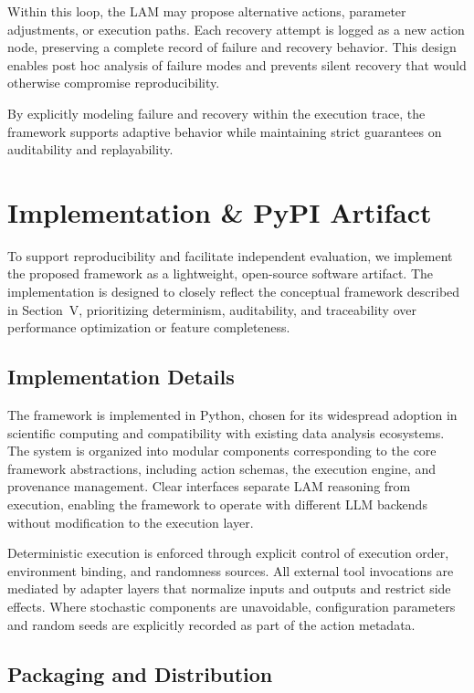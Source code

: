 \documentclass[conference]{IEEEtran}
\begin{document}
Within this loop, the LAM may propose alternative actions, parameter adjustments, or execution paths. Each recovery attempt is logged as a new action node, preserving a complete record of failure and recovery behavior. This design enables post hoc analysis of failure modes and prevents silent recovery that would otherwise compromise reproducibility.

By explicitly modeling failure and recovery within the execution trace, the framework supports adaptive behavior while maintaining strict guarantees on auditability and replayability.

\section{Implementation \& PyPI Artifact}

To support reproducibility and facilitate independent evaluation, we implement the proposed framework as a lightweight, open-source software artifact. The implementation is designed to closely reflect the conceptual framework described in Section~V, prioritizing determinism, auditability, and traceability over performance optimization or feature completeness.

\subsection{Implementation Details}

The framework is implemented in Python, chosen for its widespread adoption in scientific computing and compatibility with existing data analysis ecosystems. The system is organized into modular components corresponding to the core framework abstractions, including action schemas, the execution engine, and provenance management. Clear interfaces separate LAM reasoning from execution, enabling the framework to operate with different LLM backends without modification to the execution layer.

Deterministic execution is enforced through explicit control of execution order, environment binding, and randomness sources. All external tool invocations are mediated by adapter layers that normalize inputs and outputs and restrict side effects. Where stochastic components are unavoidable, configuration parameters and random seeds are explicitly recorded as part of the action metadata.

\subsection{Packaging and Distribution}
\end{document}
